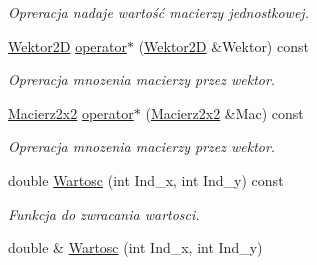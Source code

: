 \begin{DoxyCompactItemize}
\begin{DoxyCompactList}\small\item\em Opreracja nadaje wartość macierzy jednostkowej. \end{DoxyCompactList}\item 
\hypertarget{class_macierz2x2_ae3d015fffac934f951496621655f5949}{\hyperlink{class_wektor2_d}{Wektor2\+D} \hyperlink{class_macierz2x2_ae3d015fffac934f951496621655f5949}{operator$\ast$} (\hyperlink{class_wektor2_d}{Wektor2\+D} \&Wektor) const }\label{class_macierz2x2_ae3d015fffac934f951496621655f5949}

\begin{DoxyCompactList}\small\item\em Opreracja mnozenia macierzy przez wektor. \end{DoxyCompactList}\item 
\hypertarget{class_macierz2x2_a9e7656a5a09eb64be4c2fd69de006705}{\hyperlink{class_macierz2x2}{Macierz2x2} \hyperlink{class_macierz2x2_a9e7656a5a09eb64be4c2fd69de006705}{operator$\ast$} (\hyperlink{class_macierz2x2}{Macierz2x2} \&Mac) const }\label{class_macierz2x2_a9e7656a5a09eb64be4c2fd69de006705}

\begin{DoxyCompactList}\small\item\em Opreracja mnozenia macierzy przez wektor. \end{DoxyCompactList}\item 
\hypertarget{class_macierz2x2_a728b95a82bbc553d8db4f2e40ac41801}{double \hyperlink{class_macierz2x2_a728b95a82bbc553d8db4f2e40ac41801}{Wartosc} (int Ind\+\_\+x, int Ind\+\_\+y) const }\label{class_macierz2x2_a728b95a82bbc553d8db4f2e40ac41801}

\begin{DoxyCompactList}\small\item\em Funkcja do zwracania wartosci. \end{DoxyCompactList}\item 
\hypertarget{class_macierz2x2_a38ca07afa6556b6b7e10f851359f7124}{double \& \hyperlink{class_macierz2x2_a38ca07afa6556b6b7e10f851359f7124}{Wartosc} (int Ind\+\_\+x, int Ind\+\_\+y)}\label{class_macierz2x2_a38ca07afa6556b6b7e10f851359f7124}


\end{DoxyCompactItemize}
